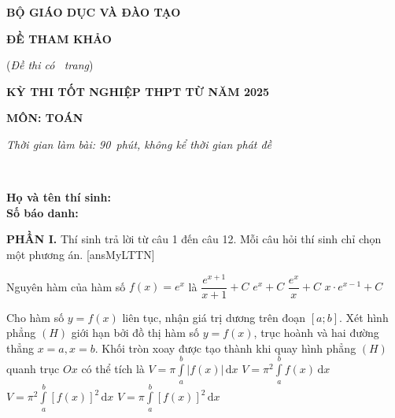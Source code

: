 \documentclass[12pt,a4paper]{article}
\begin{document}
\begin{minipage}[b]{4.5cm}
\centerline{\footnotesize\textbf{BỘ GIÁO DỤC VÀ ĐÀO TẠO}}
\centerline{\footnotesize\textbf{ĐỀ THAM KHẢO}}
\centerline{\footnotesize(\textit{Đề thi có \pageref{mylt}\ trang})}
\end{minipage}\hspace{1cm}
\begin{minipage}[b]{12cm}
\centerline{\footnotesize\textbf{KỲ THI TỐT NGHIỆP THPT TỪ NĂM 2025}}
\centerline{\footnotesize\textbf{MÔN: TOÁN}}
\centerline{\footnotesize\textit{Thời gian làm bài: 90\ phút, không kể thời gian phát đề}}
\end{minipage}\\
\begin{minipage}[b]{10cm}
\vspace{6pt}\textbf{Họ và tên thí sinh: }{\tiny\dotfill}\\
\textbf{Số báo danh: }{\tiny\dotfill}
\end{minipage}\hfill
\begin{minipage}[b]{7.5cm}
\flushright{}
\end{minipage}\hfill
\noindent\textbf{PHẦN I.} Thí sinh trả lời từ câu 1 đến câu 12. Mỗi câu hỏi thí sinh chỉ chọn một phương án.
[ansMyLTTN]
\begin{ex}%
Nguyên hàm của hàm số $f(x)=e^x$ là
\choice
{$\dfrac{e^{x+1}}{x+1}+C$}
{\True $e^x+C$}
{$\dfrac{e^x}{x}+C$}
{$x \cdot e^{x-1}+C$}
\end{ex}

\begin{ex}%
Cho hàm số $y=f(x)$ liên tục, nhận giá trị dương trên đoạn $[a ; b]$. Xét hình phẳng $(H)$ giới hạn bởi đồ thị hàm số $y=f(x)$, trục hoành và hai đường thẳng $x=a, x=b$. Khối tròn xoay được tạo thành khi quay hình phẳng $(H)$ quanh trục $O x$ có thể tích là
\choice
{$V=\pi \displaystyle\int\limits_a^b|f(x)| \mathrm{\,d}x$}
{$V=\pi^2 \displaystyle\int\limits_a^b f(x) \mathrm{\,d}x$}
{$V=\pi^2 \displaystyle\int\limits_a^b[f(x)]^2 \mathrm{\,d}x$}
{\True $V=\pi \displaystyle\int\limits_a^b[f(x)]^2 \mathrm{\,d}x$}
\end{ex}
\end{document}

